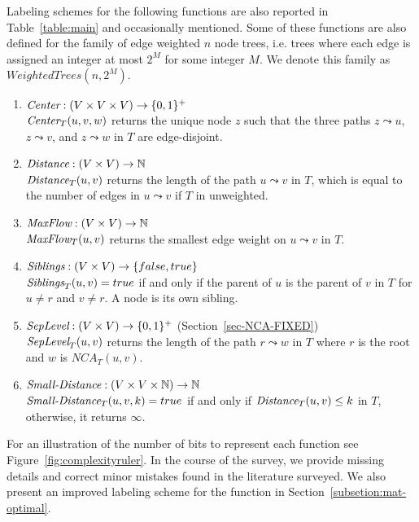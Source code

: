 	Labeling schemes for the following  functions are also reported in Table~\ref{table:main} and occasionally mentioned.
	Some of these functions are also defined for the family of edge weighted $n$ node trees, i.e. trees where each edge is assigned an integer at most $2^M$ for some integer $M$.  We denote this family as $WeightedTrees(n,2^M)$.
	\begin{enumerate}	
	\item $\emph{Center}: (V \times V \times V) \rightarrow \{ 0,1 \}^+$        %
	   \\ $\emph{Center}_T(u,v,w)$  returns the unique node $z$ such that the three paths  $z \leadsto u$, $z \leadsto v$, and  $z \leadsto w$  in $T$ are edge-disjoint.
	\item $\emph{Distance}: (V \times V) \rightarrow  \mathbb{N}$         %
	  \\ $\emph{Distance}_T(u,v)$ returns the length of the path  $u \leadsto v $ in $T$, which is  equal to the number of edges in $u \leadsto v$ if $T$ in unweighted.
	\item $\emph{MaxFlow}: (V \times V) \rightarrow  \mathbb{N}$         %
	\\ $\emph{MaxFlow}_T(u,v) $ returns the smallest edge weight on $ u \leadsto v$  in $T$.
	\item $\emph{Siblings}: (V \times V) \rightarrow \{false,true\}$       %
	 \\ $\emph{Siblings}_T(u,v) = true$ if and only if  the parent of $u$ is the parent of $v$ in $T$ for $u \neq r$ and $v \neq r$. A node is its own sibling.
	\item $\emph{SepLevel}: (V \times V) \rightarrow  \{ 0,1 \}^+$        (Section~\ref{sec-NCA-FIXED}) 			  \\ $\emph{SepLevel}_T(u,v)$ returns the length of the path  $r \leadsto w $ in $T$ where $r$ is the root and $w$ is $NCA_T(u,v)$.
	\item $\emph{Small-Distance}: (V \times V \times  \mathbb{N}) \rightarrow  \mathbb{N}$    
	\\ $\emph{Small-Distance}_T(u,v,k)= true$  if and only if $\emph{Distance}_T (u, v) \leq k$ in $T$, otherwise, it returns $\infty$.
	\end{enumerate}
	
For an illustration of the number of bits 
 to represent each function see Figure~\ref{fig:complexityruler}.
In the course of the survey, we provide missing details and correct minor mistakes found in the literature surveyed.
We also present an improved labeling scheme for the function \ancestry in Section~\ref{subsetion:mat-optimal}.

